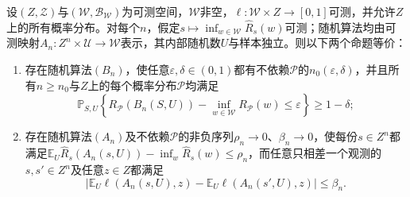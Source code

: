 \begin{theorem}
\label{thm:general-stability-characterization}
设$(Z,\mathcal Z)$与$(\mathcal W,\mathcal B_{\mathcal W})$为可测空间，$\mathcal W$非空，$\ell:\mathcal W\times Z\to[0,1]$可测，并允许$Z$上的所有概率分布。对每个$n$，假定$s\mapsto\inf_{w\in\mathcal W}\hat R_s(w)$可测；随机算法均由可测映射$A_n:Z^n\times\mathcal U\to\mathcal W$表示，其内部随机数$U$与样本独立。则以下两个命题等价：
\begin{enumerate}
 \item 存在随机算法$(B_n)$，使任意$\varepsilon,\delta\in(0,1)$都有不依赖$\mathcal P$的$n_0(\varepsilon,\delta)$，并且所有$n\geq n_0$与$Z$上的每个概率分布$\mathcal P$均满足
 \[
  \mathbb P_{S,U}\!\left\{R_{\mathcal P}(B_n(S,U))-\inf_{w\in\mathcal W}R_{\mathcal P}(w)\leq\varepsilon\right\}\geq1-\delta;
 \]
 \item 存在随机算法$(A_n)$及不依赖$\mathcal P$的非负序列$\rho_n\to0$、$\beta_n\to0$，使每份$s\in Z^n$都满足$\mathbb E_U\hat R_s(A_n(s,U))-\inf_{w}\hat R_s(w)\leq\rho_n$，而任意只相差一个观测的$s,s'\in Z^n$及任意$z\in Z$都满足
 \[
  \left|\mathbb E_U\ell(A_n(s,U),z)-\mathbb E_U\ell(A_n(s',U),z)\right|\leq\beta_n.
 \]
\end{enumerate}
\end{theorem}

